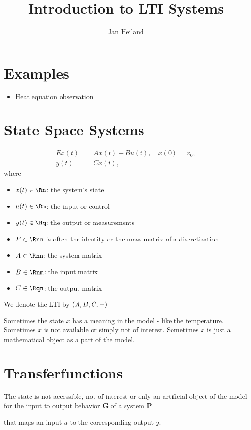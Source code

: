 \documentclass[a4paper,10pt]{article}
\title{Introduction to LTI Systems}
\author{Jan Heiland}
\theoremstyle{definition}
\begin{document}
\maketitle
\tableofcontents


\section{Examples}
\begin{itemize}
	\item Heat equation observation
\end{itemize}
\section{State Space Systems}
\begin{align}\label{eq:lti}
	Ex(t) &= Ax(t) + Bu(t), \quad x(0) = x_0, \\
	y(t) &= Cx(t),
\end{align}
where 
\begin{itemize}
	\item $x(t) \in \Rn$: the system's state
	\item $u(t) \in \Rm$: the input or control
	\item $y(t) \in \Rq$: the output or measurements
	\item $E \in \Rnn$ is often the identity or the mass matrix of a discretization
	\item $A \in \Rnn$: the system matrix
	\item $B \in \Rnm$: the input matrix
	\item $C \in \Rqn$: the output matrix
\end{itemize}

We denote the LTI by $(A,B,C,-)$

Sometimes the state $x$ has a meaning in the model - like the temperature. Sometimes $x$ is not available or simply not of interest. Sometimes $x$ is just a mathematical object as a part of the model. 

\section{Transferfunctions}
The state is not accessible, not of interest or only an artificial object of the model for the input to output behavior $\mathbf G$ of a system $\mathbf P$
\begin{figure}[h]
\centering
{}
\end{figure}
that maps an input $u$ to the corresponding output $y$.
\end{document}
